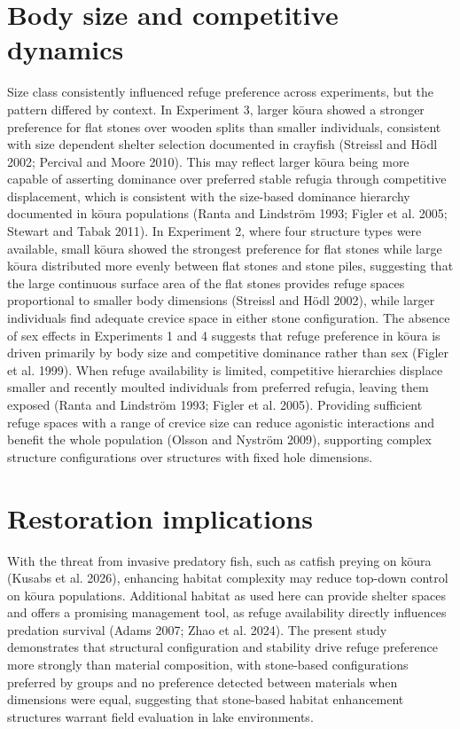 \documentclass[
  12pt,
  a4paper,
]{scrbook}
\begin{document}
\section{Body size and competitive
dynamics}\label{body-size-and-competitive-dynamics}

Size class consistently influenced refuge preference across experiments,
but the pattern differed by context. In Experiment 3, larger kōura
showed a stronger preference for flat stones over wooden splits than
smaller individuals, consistent with size dependent shelter selection
documented in crayfish (Streissl and Hödl 2002; Percival and Moore
2010). This may reflect larger kōura being more capable of asserting
dominance over preferred stable refugia through competitive
displacement, which is consistent with the size-based dominance
hierarchy documented in kōura populations (Ranta and Lindström 1993;
Figler et al. 2005; Stewart and Tabak 2011). In Experiment 2, where four
structure types were available, small kōura showed the strongest
preference for flat stones while large kōura distributed more evenly
between flat stones and stone piles, suggesting that the large
continuous surface area of the flat stones provides refuge spaces
proportional to smaller body dimensions (Streissl and Hödl 2002), while
larger individuals find adequate crevice space in either stone
configuration. The absence of sex effects in Experiments 1 and 4
suggests that refuge preference in kōura is driven primarily by body
size and competitive dominance rather than sex (Figler et al. 1999).
When refuge availability is limited, competitive hierarchies displace
smaller and recently moulted individuals from preferred refugia, leaving
them exposed (Ranta and Lindström 1993; Figler et al. 2005). Providing
sufficient refuge spaces with a range of crevice size can reduce
agonistic interactions and benefit the whole population (Olsson and
Nyström 2009), supporting complex structure configurations over
structures with fixed hole dimensions.

\section{Restoration implications}\label{restoration-implications}

With the threat from invasive predatory fish, such as catfish preying on
kōura (Kusabs et al. 2026), enhancing habitat complexity may reduce
top-down control on kōura populations. Additional habitat as used here
can provide shelter spaces and offers a promising management tool, as
refuge availability directly influences predation survival (Adams 2007;
Zhao et al. 2024). The present study demonstrates that structural
configuration and stability drive refuge preference more strongly than
material composition, with stone-based configurations preferred by
groups and no preference detected between materials when dimensions were
equal, suggesting that stone-based habitat enhancement structures
warrant field evaluation in lake environments.
\end{document}
